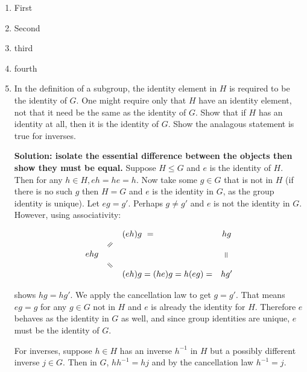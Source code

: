 \documentclass[main.tex]{subfiles}
\begin{document}
\begin{enumerate}[label=2.\arabic*]
    \item First
    \item Second
    \item third
    \item fourth
    \item In the definition of a subgroup, the identity element in $H$ is required to be the identity of $G$. One might require only that $H$ have an identity element, not that it need be the same as the identity of $G$. Show that if $H$ has an identity at all, then it is the identity of $G$. Show the analagous statement is true for inverses.
    
    \textbf{Solution: isolate the essential difference between the objects then show they must be equal.}
    Suppose $H \leq G$ and $e$ is the identity of $H$. Then for any $h \in H, eh = he = h$. Now take some $g \in G$ that is not in $H$ (if there is no such $g$ then $H = G$ and $e$ is the identity in $G$, as the group identity is unique). Let $eg = g'$. Perhaps $g \neq g'$ and $e$ is not the identity in $G$. However, using associativity:

    $$
    \begin{array}{cllc}
    & & (eh)g \ = &hg \\
    & \uequals & &\\
    ehg & & & \vequals\\
    & \dequals & & \\
    & & (eh)g = (he)g = h(eg) = &hg' \\
    \end{array}
    $$

    shows $hg = hg'$. We apply the cancellation law to get $g = g'$. That means $eg = g$ for any $g \in G$ not in $H$ and $e$ is already the identity for $H$. Therefore $e$ behaves as the identity in $G$ as well, and since group identities are unique, $e$ must be the identity of $G$.

    For inverses, suppose $h \in H$ has an inverse $h^{-1}$ in $H$ but a possibly different inverse $j \in G$. Then in $G$, $hh^{-1} = hj$ and by the cancellation law $h^{-1} = j$. 

\end{enumerate}
\end{document}
